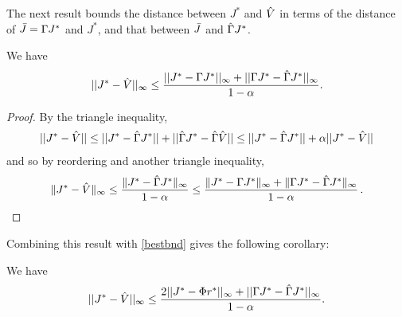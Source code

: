 The next result bounds the distance between $J^*$ and $\hat{V}$ in terms of the distance of $\bar{J} = \Gamma J^*$ and $J^*$, and that between $\bar{J}$ and $\hat{\Gamma} J^*$.
\begin{theorem}\label{mt1}
We have
\begin{align}
||J^*-\hat{V}||_\infty\leq \frac{||J^*-\Gamma J^*||_\infty+||\Gamma J^*-\hat{\Gamma} J^*||_\infty}{1-\alpha}.
\end{align}
\end{theorem}
\begin{proof}
By the triangle inequality,
\begin{align}
||J^*-\hat{V}||\leq ||J^*-\hat{\Gamma} J^*||+||\hat{\Gamma} J^*-\hat{\Gamma} \hat{V}||\leq ||J^*-\hat{\Gamma} J^*||+\alpha || J^*- \hat{V}||
\end{align}
and so by reordering and another triangle inequality,
\begin{align*}
\|J^*-\hat{V}\|_{\infty} \le \frac{\| J^*-\hat{\Gamma} J^*\|_{\infty}}{1-\alpha}
\le \frac{\| J^*-\Gamma J^*\|_{\infty}+\|\Gamma J^* - \hat{\Gamma} J^*\|_{\infty}}{1-\alpha}\,.
\end{align*}
\end{proof}
\noindent Combining this result with \cref{bestbnd} gives the following corollary:
\begin{corollary}\label{cmt1}
We have
\begin{align}
||J^*-\hat{V}||_\infty\leq \frac{2||J^*-\Phi r^*||_\infty+||\Gamma J^*-\hat{\Gamma} J^*||_\infty}{1-\alpha}.
\end{align}
\end{corollary}
